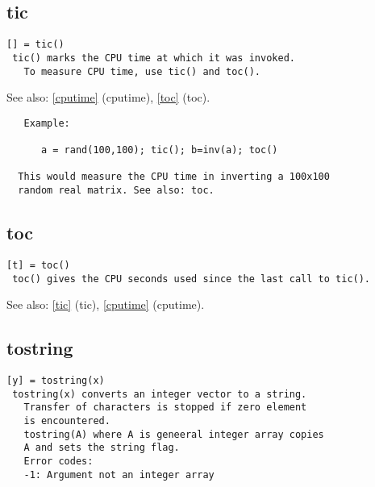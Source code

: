 \documentclass[a4paper]{article}
\begin{document}
\subsection{tic\label{tic}}

\begin{tscreen}
\begin{verbatim}
[] = tic()
 tic() marks the CPU time at which it was invoked.
   To measure CPU time, use tic() and toc().
\end{verbatim}

See also: \ref{cputime} {(cputime)}, \ref{toc} {(toc)}.
\begin{verbatim}
   Example:

      a = rand(100,100); tic(); b=inv(a); toc()

  This would measure the CPU time in inverting a 100x100
  random real matrix. See also: toc. 
\end{verbatim}
\end{tscreen}





\subsection{toc\label{toc}}

\begin{tscreen}
\begin{verbatim}
[t] = toc()
 toc() gives the CPU seconds used since the last call to tic().
\end{verbatim}

See also: \ref{tic} {(tic)}, \ref{cputime} {(cputime)}.
\end{tscreen}





\subsection{tostring\label{tostring}}

\begin{tscreen}
\begin{verbatim}
[y] = tostring(x)
 tostring(x) converts an integer vector to a string.
   Transfer of characters is stopped if zero element
   is encountered.
   tostring(A) where A is geneeral integer array copies
   A and sets the string flag.
   Error codes:
   -1: Argument not an integer array
   
\end{verbatim}
\end{tscreen}
\end{document}
